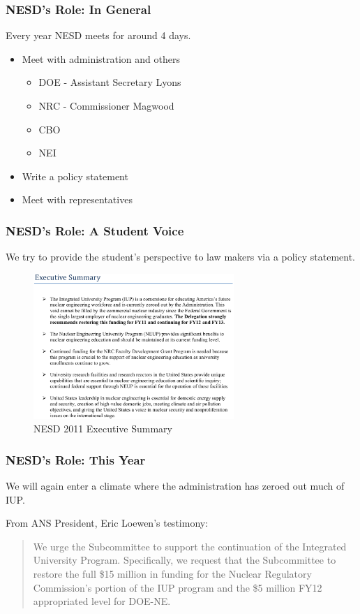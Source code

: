 \begin{frame}[ctb!]
  \frametitle{NESD's Role: In General}
  Every year NESD meets for around 4 days.
  \begin{itemize}
    \item Meet with administration and others
      \begin{itemize}
        \item DOE - Assistant Secretary Lyons
        \item NRC - Commissioner Magwood
        \item CBO
        \item NEI
      \end{itemize}
    \item Write a policy statement
    \item Meet with representatives
  \end{itemize}
\end{frame}

\begin{frame}[ctb!]
  \frametitle{NESD's Role: A Student Voice}
  We try to provide the student's perspective to law makers via
  a policy statement.
  \begin{figure}[htbp!]
    \begin{center}
      \includegraphics[height=5.5cm]{exec.eps}
    \caption{NESD 2011 Executive Summary}
    \label{fig:exec}
    \end{center}
  \end{figure}
\end{frame}

\begin{frame}[ctb!]
  \frametitle{NESD's Role: This Year}
  We will again enter a climate where the administration has
  zeroed out much of IUP.
  \vspace{0.4cm}
  \pause
  
  From ANS President, Eric Loewen's testimony\cite{loewen_testimony_2012}:
  \begin{quote}
    We urge the Subcommittee to support the continuation of the 
    Integrated University Program. Specifically, we request that 
    the Subcommittee to restore the full \$15 million in funding 
    for the Nuclear Regulatory Commission's portion of the IUP
    program and the \$5 million FY12 appropriated level for DOE-NE. 
  \end{quote}
\end{frame}
